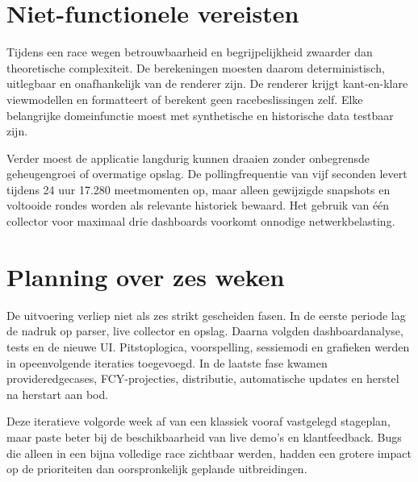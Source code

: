 \section{Niet-functionele vereisten}
Tijdens een race wegen betrouwbaarheid en begrijpelijkheid zwaarder dan theoretische complexiteit. De berekeningen moesten daarom deterministisch, uitlegbaar en onafhankelijk van de renderer zijn. De renderer krijgt kant-en-klare viewmodellen en formatteert of berekent geen racebeslissingen zelf. Elke belangrijke domeinfunctie moest met synthetische en historische data testbaar zijn.

Verder moest de applicatie langdurig kunnen draaien zonder onbegrensde geheugengroei of overmatige opslag. De pollingfrequentie van vijf seconden levert tijdens 24 uur 17.280 meetmomenten op, maar alleen gewijzigde snapshots en voltooide rondes worden als relevante historiek bewaard. Het gebruik van één collector voor maximaal drie dashboards voorkomt onnodige netwerkbelasting.

\section{Planning over zes weken}
De uitvoering verliep niet als zes strikt gescheiden fasen. In de eerste periode lag de nadruk op parser, live collector en opslag. Daarna volgden dashboardanalyse, tests en de nieuwe UI. Pitstoplogica, voorspelling, sessiemodi en grafieken werden in opeenvolgende iteraties toegevoegd. In de laatste fase kwamen provideredgecases, FCY-projecties, distributie, automatische updates en herstel na herstart aan bod.

Deze iteratieve volgorde week af van een klassiek vooraf vastgelegd stageplan, maar paste beter bij de beschikbaarheid van live demo's en klantfeedback. Bugs die alleen in een bijna volledige race zichtbaar werden, hadden een grotere impact op de prioriteiten dan oorspronkelijk geplande uitbreidingen.

